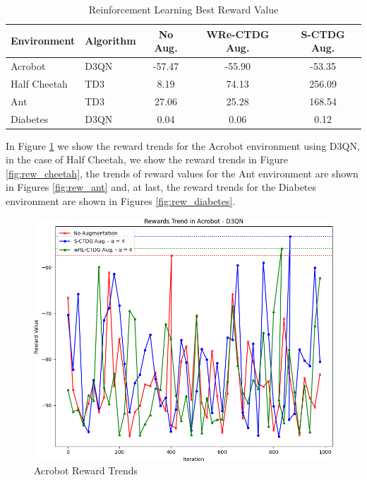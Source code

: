 \begin{table}[H]
    \centering
    \begin{tabular}{@{}llccc@{}}
        \toprule
        \textbf{Environment} & \textbf{Algorithm} & \textbf{No Aug.} & \textbf{WRe-CTDG Aug.} & \textbf{S-CTDG Aug.} \\ \midrule
        Acrobot              & D3QN               & -57.47           & -55.90                 & -53.35               \\
        Half Cheetah         & TD3                & 8.19             & 74.13                  & 256.09                \\
        Ant                  & TD3                & 27.06            & 25.28                  & 168.54                 \\
        Diabetes             & D3QN               & 0.04             & 0.06                   & 0.12                   \\ \bottomrule
    \end{tabular}
    \caption{Reinforcement Learning Best Reward Value}
    \label{tab:rl_reward}
\end{table}

In Figure \ref{fig:rew_acrobot} we show the reward trends for the
Acrobot environment using D3QN,
in the case of Half Cheetah, we show the reward trends in
Figure \ref{fig:rew_cheetah},
the trends of reward values for the Ant environment
are shown in Figures \ref{fig:rew_ant} and,
at last, the reward trends for the Diabetes environment are shown in
Figures \ref{fig:rew_diabetes}.

\begin{figure}[H]
    \centering
    \includegraphics[width=.8\textwidth]{figures/ch5/rew_acrobot.png}
    \caption{Acrobot Reward Trends}
    \label{fig:rew_acrobot}
\end{figure}

